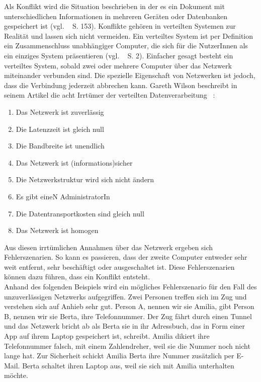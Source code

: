 Als Konflikt wird die Situation beschrieben in der es ein Dokument mit unterschiedlichen Informationen in mehreren Geräten oder Datenbanken gespeichert ist (vgl. ~\cite{couchDB} S. 153).
Konflikte gehören in verteilten Systemen zur Realität und lassen sich nicht vermeiden.
Ein verteiltes System ist per Definition ein Zusammenschluss unabhängiger Computer, die sich für die NutzerInnen als ein einziges System präsentieren (vgl. ~\cite{tanenbaum} S. 2).
Einfacher gesagt besteht ein verteiltes System, sobald zwei oder mehrere Computer über das Netzwerk miteinander verbunden sind.
Die spezielle Eigenschaft von Netzwerken ist jedoch, dass die Verbindung jederzeit abbrechen kann.
Gareth Wilson beschreibt in seinem Artikel die acht Irrtümer der verteilten Datenverarbeitung ~\cite{fallacies}:
\begin{enumerate}
  \item Das Netzwerk ist zuverlässig
  \item Die \gls{Latenz}zeit ist gleich null
  \item Die Bandbreite ist unendlich
  \item Das Netzwerk ist (informations)sicher
  \item Die Netzwerkstruktur wird sich nicht ändern
  \item Es gibt eineN AdministratorIn
  \item Die Datentransportkosten sind gleich null
  \item Das Netzwerk ist homogen
\end{enumerate}
Aus diesen irrtümlichen Annahmen über das Netzwerk ergeben sich Fehlerszenarien. So kann es passieren, dass der zweite Computer entweder sehr weit entfernt, sehr beschäftigt oder ausgeschaltet ist. Diese Fehlerszenarien können dazu führen, dass ein Konflikt entsteht.\\
Anhand des folgenden Beispiels wird ein mögliches Fehlerszenario für den Fall des unzuverlässigen Netzwerks aufgegriffen.
Zwei Personen treffen sich im Zug und verstehen sich auf Anhieb sehr gut. Person A, nennen wir sie Amilia, gibt Person B, nennen wir sie Berta, ihre Telefonnummer. Der Zug fährt durch einen Tunnel und das Netzwerk bricht ab als Berta sie in ihr Adressbuch, das in Form einer \gls{App} auf ihrem Laptop gespeichert ist, schreibt.
Amilia dikiert ihre Telefonnummer falsch, mit einem Zahlendreher, weil sie die Nummer noch nicht lange hat.
Zur Sicherheit schickt Amilia Berta ihre Nummer zusätzlich per E-Mail. Berta schaltet ihren Laptop aus, weil sie sich mit Amilia unterhalten möchte.
